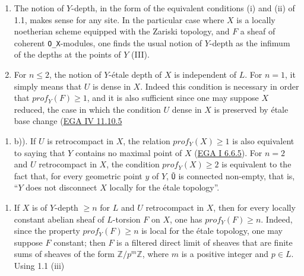 \documentclass[
  11pt,
  a4paper,
]{book}
\providecommand{\tightlist}{%
  \setlength{\itemsep}{0pt}\setlength{\parskip}{0pt}}
\begin{document}
\begin{enumerate}
\def\labelenumi{\alph{enumi})}
\item
  The notion of \(Y\)-depth, in the form of the equivalent conditions
  (i) and (ii) of 1.1, makes sense for any site. In the particular case
  where \(X\) is a locally noetherian scheme equipped with the Zariski
  topology, and \(F\) a sheaf of coherent \texttt{O\_X}-modules, one
  finds the usual notion of \(Y\)-depth as the infimum of the depths at
  the points of \(Y\) (III).
\item
  For \(n \leqslant 2\), the notion of \(Y\)-étale depth of \(X\) is
  independent of \(L\). For \(n = 1\), it simply means that \(U\) is
  dense in \(X\). Indeed this condition is necessary in order that
  \(prof_{Y}(F) \geqslant 1\), and it is also sufficient since one may
  suppose \(X\) reduced, the case in which the condition \(U\) dense in
  \(X\) is preserved by étale base change
  (\href{https://jcreinhold.github.io/ega/iv/23a-ch4-11-flatness-loci-and-descent.html\#1110-schematically-dominant-families-of-morphisms-and-schematically-dense-families-of-subpreschemes}{EGA
  IV 11.10.5}
\end{enumerate}

\begin{enumerate}
\def\labelenumi{(\roman{enumi})}
\setcounter{enumi}{1}
\tightlist
\item
  b)). If \(U\) is retrocompact in \(X\), the relation
  \(prof_{Y}(X) \geqslant 1\) is also equivalent to saying that \(Y\)
  contains no maximal point of \(X\)
  (\href{https://jcreinhold.github.io/ega/i/01-06-finiteness-conditions.html\#66-quasi-compact-morphisms}{EGA
  I 6.6.5}). For \(n = 2\) and \(U\) retrocompact in \(X\), the
  condition \(prof_{Y}(X) \geqslant 2\) is equivalent to the fact that,
  for every geometric point \(y\) of \(Y\), \texttt{Ū} is connected
  non-empty, that is, ``\(Y\) does not disconnect \(X\) locally for the
  étale topology''.
\end{enumerate}

\begin{enumerate}
\def\labelenumi{\alph{enumi})}
\setcounter{enumi}{2}
\tightlist
\item
  If \(X\) is of \(Y\)-depth \(\geqslant n\) for \(L\) and \(U\)
  retrocompact in \(X\), then for every locally constant abelian sheaf
  of \(L\)-torsion \(F\) on \(X\), one has \(prof_{Y}(F) \geqslant n\).
  Indeed, since the property \(prof_{Y}(F) \geqslant n\) is local for
  the étale topology, one may suppose \(F\) constant; then \(F\) is a
  filtered direct limit of sheaves that are finite sums of sheaves of
  the form \(\mathbb{Z}/p^{m} \mathbb{Z}\), where \(m\) is a positive
  integer and \(p \in L\). Using 1.1 (iii)
\end{enumerate}
\end{document}
